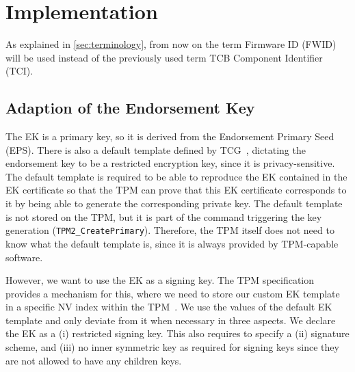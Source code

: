 
\chapter{Implementation}\label{chapter:implementation}

As explained in \autoref{sec:terminology}, from now on the term Firmware ID (FWID) will be used instead of the previously used term TCB Component Identifier (TCI).



\section{Adaption of the Endorsement Key}

The EK is a primary key, so it is derived from the Endorsement Primary Seed (EPS).
There is also a default template defined by TCG~\cite{tcg-ek}, dictating the endorsement key to be a restricted encryption key, since it is privacy-sensitive.
The default template is required to be able to reproduce the EK contained in the EK certificate so that the TPM can prove that this EK certificate corresponds to it by being able to generate the corresponding private key.
The default template is not stored on the TPM, but it is part of the command triggering the key generation (\texttt{TPM2\_CreatePrimary}).
Therefore, the TPM itself does not need to know what the default template is, since it is always provided by TPM-capable software.

However, we want to use the EK as a signing key.
The TPM specification provides a mechanism for this, where we need to store our custom EK template in a specific NV index within the TPM~\cite{tcg-ek}.
We use the values of the default EK template and only deviate from it when necessary in three aspects.
We declare the EK as a (i) restricted signing key.
This also requires to specify a (ii) signature scheme, and (iii) no inner symmetric key as required for signing keys since they are not allowed to have any children keys.

